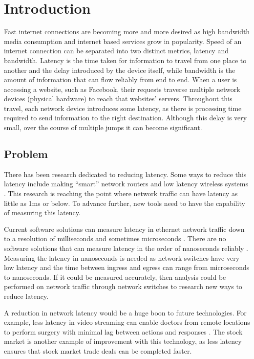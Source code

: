 \chapter{Introduction}\label{C:intro}

\par Fast internet connections are becoming more and more desired as high bandwidth media consumption and internet based services grow in popularity. 
Speed of an internet connection can be separated into two distinct metrics, latency and bandwidth. 
Latency is the time taken for information to travel from one place to another and the delay introduced by the device itself, while bandwidth is the amount of information that can flow reliably from end to end.
When a user is accessing a website, such as Facebook, their requests traverse multiple network devices
(physical hardware) to reach that websites’ servers. Throughout this travel, each network device
introduces some latency, as there is processing time required to send information to the right
destination. Although this delay is very small, over the course of multiple jumps it can become
significant.

\section{Problem}

\par There has been research dedicated to reducing latency. Some ways to reduce this latency include making “smart” network routers \cite{smartrouters} and low latency wireless systems \cite{5g}. 
This research is reaching the point where network traffic can have latency as little as 1ms \cite{lessthan1ms} or below.
To advance further, new tools need to have the capability of measuring this latency.

\par Current software solutions can measure latency in ethernet network traffic down to a resolution of
milliseconds and sometimes microseconds \cite{pingisbad}. There are no software solutions that can measure
latency in the order of nanoseconds reliably \cite{timeinlinux}. Measuring the latency in nanoseconds is needed as
network switches have very low latency and the time between ingress and egress can range from
microseconds to nanoseconds. If it could be measured accurately, then analysis could be performed
on network traffic through network switches to research new ways to reduce latency.

\par A reduction in network latency would be a huge boon to future technologies. For example, less
latency in video streaming can enable doctors from remote locations to perform surgery with
minimal lag between actions and responses \cite{remotesurgery}. The stock market is another example of improvement with
this technology, as less latency ensures that stock market trade deals can be completed faster.

